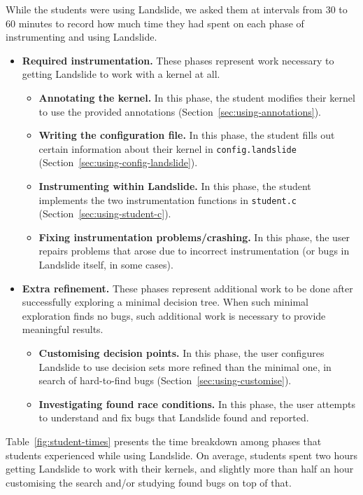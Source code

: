 {While the students were using Landslide, we asked them at intervals from 30 to 60 minutes to record how much time they had spent on each phase of instrumenting and using Landslide.

\begin{itemize}
	\item {\bf Required instrumentation.} These phases represent work necessary to getting Landslide to work with a kernel at all.
	\begin{itemize}
		\item {\bf Annotating the kernel.} In this phase, the student modifies their kernel to use the provided annotations (Section~\ref{sec:using-annotations}).
		\item {\bf Writing the configuration file.} In this phase, the student fills out certain information about their kernel in \texttt{config.landslide} (Section~\ref{sec:using-config-landslide}).
		\item {\bf Instrumenting within Landslide.} In this phase, the student implements the two instrumentation functions in \texttt{student.c} (Section~\ref{sec:using-student-c}).
		\item {\bf Fixing instrumentation problems/crashing.} In this phase, the user repairs problems that arose due to incorrect instrumentation (or bugs in Landslide itself, in some cases).
	\end{itemize}
	\item {\bf Extra refinement.} These phases represent additional work to be done after successfully exploring a minimal decision tree. When such minimal exploration finds no bugs, such additional work is necessary to provide meaningful results.
	\begin{itemize}
		\item {\bf Customising decision points.} In this phase, the user configures Landslide to use decision sets more refined than the minimal one, in search of hard-to-find bugs (Section~\ref{sec:using-customise}).
		\item {\bf Investigating found race conditions.} In this phase, the user attempts to understand and fix bugs that Landslide found and reported.
	\end{itemize}
\end{itemize}

Table~\ref{fig:student-times} presents the time breakdown among phases that students experienced while using Landslide. On average, students spent two hours getting Landslide to work with their kernels, and slightly more than half an hour customising the search and/or studying found bugs on top of that.

}

